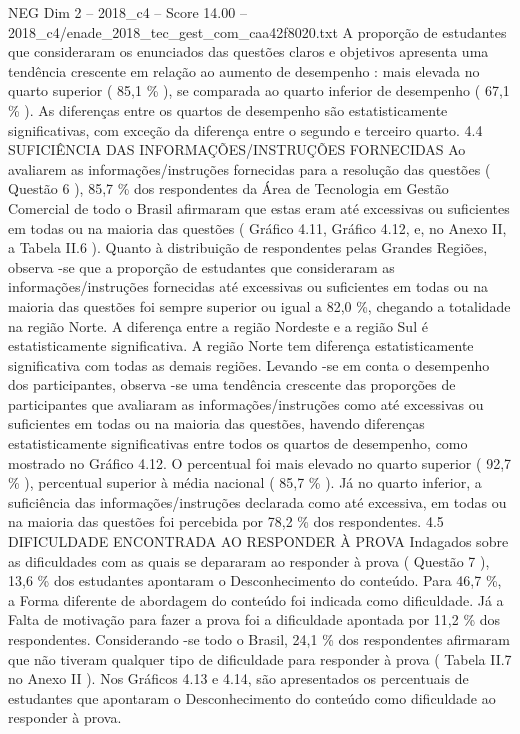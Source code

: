 \begin{textsample}{NEG Dim 2 – 2018\_c4 – Score 14.00 – 2018\_c4/enade\_2018\_tec\_gest\_com\_caa42f8020.txt}
A proporção de estudantes que consideraram os enunciados das questões claros e objetivos apresenta uma tendência crescente em relação ao aumento de desempenho : mais elevada no quarto superior ( 85,1 \% ), se comparada ao quarto inferior de desempenho ( 67,1 \% ).
As diferenças entre os quartos de desempenho são estatisticamente significativas, com exceção da diferença entre o segundo e terceiro quarto. 4.4 SUFICIÊNCIA DAS INFORMAÇÕES/INSTRUÇÕES FORNECIDAS Ao avaliarem as informações/instruções fornecidas para a resolução das questões ( Questão 6 ), 85,7 \% dos respondentes da Área de Tecnologia em Gestão Comercial de todo o Brasil afirmaram que estas eram até excessivas ou suficientes em todas ou na maioria das questões ( Gráfico 4.11, Gráfico 4.12, e, no Anexo II, a Tabela II.6 ).
Quanto à distribuição de respondentes pelas Grandes Regiões, observa -se que a proporção de estudantes que consideraram as informações/instruções fornecidas até excessivas ou suficientes em todas ou na maioria das questões foi sempre superior ou igual a 82,0 \%, chegando a totalidade na região Norte.
A diferença entre a região Nordeste e a região Sul é estatisticamente significativa.
A região Norte tem diferença estatisticamente significativa com todas as demais regiões.
Levando -se em conta o desempenho dos participantes, observa -se uma tendência crescente das proporções de participantes que avaliaram as informações/instruções como até excessivas ou suficientes em todas ou na maioria das questões, havendo diferenças estatisticamente significativas entre todos os quartos de desempenho, como mostrado no Gráfico 4.12.
O percentual foi mais elevado no quarto superior ( 92,7 \% ), percentual superior à média nacional ( 85,7 \% ).
Já no quarto inferior, a suficiência das informações/instruções declarada como até excessiva, em todas ou na maioria das questões foi percebida por 78,2 \% dos respondentes. 4.5 DIFICULDADE ENCONTRADA AO RESPONDER À PROVA Indagados sobre as dificuldades com as quais se depararam ao responder à prova ( Questão 7 ), 13,6 \% dos estudantes apontaram o Desconhecimento do conteúdo.
Para 46,7 \%, a Forma diferente de abordagem do conteúdo foi indicada como dificuldade.
Já a Falta de motivação para fazer a prova foi a dificuldade apontada por 11,2 \% dos respondentes.
Considerando -se todo o Brasil, 24,1 \% dos respondentes afirmaram que não tiveram qualquer tipo de dificuldade para responder à prova ( Tabela II.7 no Anexo II ).
Nos Gráficos 4.13 e 4.14, são apresentados os percentuais de estudantes que apontaram o Desconhecimento do conteúdo como dificuldade ao responder à prova.

\end{textsample}
